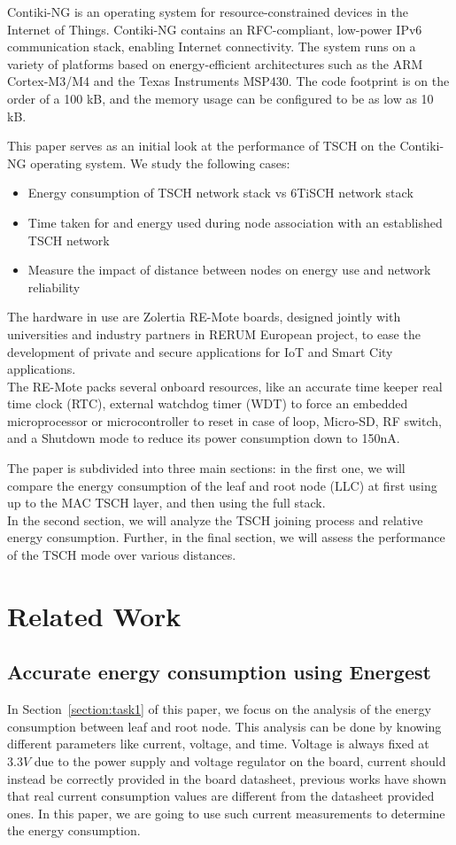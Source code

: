 \documentclass[conference]{IEEEtran}
\newcommand{\secref}[1]{Section~\ref{#1}}
\renewcommand\_{\textunderscore\allowbreak}
\begin{document}
Contiki-NG is an operating system for resource-constrained devices in the Internet of Things. Contiki-NG contains an RFC-compliant, low-power IPv6 communication stack, enabling Internet connectivity. The system runs on a variety of platforms based on energy-efficient architectures such as the ARM Cortex-M3/M4 and the Texas Instruments MSP430. The code footprint is on the order of a 100 kB, and the memory usage can be configured to be as low as 10 kB. 

This paper serves as an initial look at the performance of TSCH on the Contiki-NG operating system. We study the following cases:
\begin{itemize}
\item Energy consumption of TSCH network stack vs 6TiSCH network stack
\item Time taken for and energy used during node association with an established TSCH network
\item Measure the impact of distance between nodes on energy use and network reliability
\end{itemize}

The hardware in use are Zolertia RE-Mote boards, designed jointly with universities and industry partners in RERUM European project, to ease the development of private and secure applications for IoT and Smart City applications.\\
The RE-Mote packs several onboard resources, like an accurate time keeper real time clock (RTC), external watchdog timer (WDT) to force an embedded microprocessor or microcontroller to reset in case of loop, Micro-SD, RF switch, and a Shutdown mode to reduce its power consumption down to 150nA\cite{contiki-NGWiki}.

The paper is subdivided into three main sections: in the first one, we will compare the energy consumption of the leaf and root node (LLC) at first using up to the MAC TSCH layer, and then using the full stack.\\
In the second section, we will analyze the TSCH joining process and relative energy consumption. Further, in the final section, we will assess the performance of the TSCH mode over various distances.



\section{Related Work}
\subsection{Accurate energy consumption using Energest}
In \secref{section:task1} of this paper, we focus on the analysis of the energy consumption between leaf and root node. This analysis can be done by knowing different parameters like current, voltage, and time. Voltage is always fixed at $3.3V$ due to the power supply and voltage regulator on the board, current should instead be correctly provided in the board datasheet, previous works have shown that real current consumption values are different from the datasheet provided ones\cite{EnergyConsumption}. In this paper, we are going to use such current measurements to determine the energy consumption.
\end{document}
